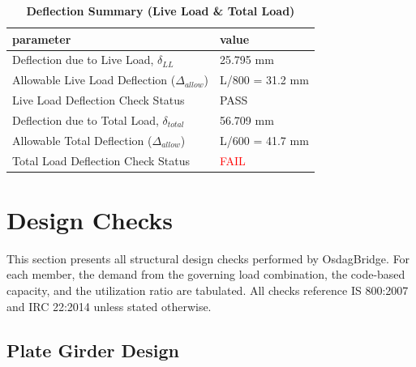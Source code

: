 \documentclass[12pt,a4paper]{report}
\numberwithin{table}{chapter}
\numberwithin{figure}{chapter}
\begin{document}
\vspace{1em}
\begin{longtable}{|L{7cm}|p{8.5cm}|}
\caption{\textbf{Deflection Summary (Live Load \& Total Load)}}
\hline
\textbf{parameter} & \textbf{value} \\
\hline
\textnormal{Deflection due to Live Load, $\delta_{LL}$} & 25.795 mm \\[6pt]
\hline
\textnormal{Allowable Live Load Deflection ($\Delta_{allow}$)} & L/800 = 31.2 mm \\[6pt]
\hline
\textnormal{Live Load Deflection Check Status} & PASS \\[6pt]
\hline
\textnormal{Deflection due to Total Load, $\delta_{total}$} & 56.709 mm \\[6pt]
\hline
\textnormal{Allowable Total Deflection ($\Delta_{allow}$)} & L/600 = 41.7 mm \\[6pt]
\hline
\textnormal{Total Load Deflection Check Status} & \textcolor{red}{FAIL} \\[6pt]
\hline
\end{longtable}

\vspace{1em}
\noindent
\noindent{}
\noindent{}
\noindent{}


\chapter{Design Checks}

This section presents all structural design checks performed by OsdagBridge. For each member, the demand from the governing load combination, the code-based capacity, and the utilization ratio are tabulated. All checks reference IS 800:2007 and IRC 22:2014 unless stated otherwise.

\section{Plate Girder Design}
\label{sec:plate-girder}
\end{document}
